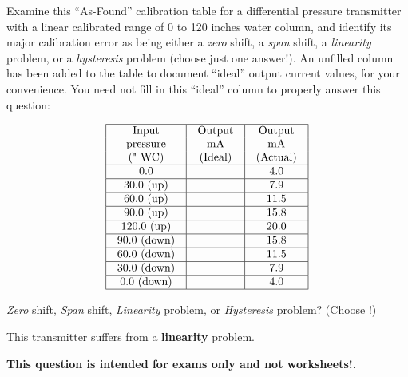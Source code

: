 

Examine this ``As-Found'' calibration table for a differential pressure transmitter with a linear calibrated range of 0 to 120 inches water column, and identify its major calibration error as being either a {\it zero} shift, a {\it span} shift, a {\it linearity} problem, or a {\it hysteresis} problem (choose just one answer!).  An unfilled column has been added to the table to document ``ideal'' output current values, for your convenience.  You need not fill in this ``ideal'' column to properly answer this question:


$$\vbox{\offinterlineskip
\halign{\strut
\vrule \quad\hfil # \ \hfil & 
\vrule \quad\hfil # \ \hfil & 
\vrule \quad\hfil # \ \hfil \vrule \cr
\noalign{\hrule}
%
Input & Output & Output \cr
%
pressure & mA & mA \cr
%
(" WC) & (Ideal) & (Actual) \cr
%
\noalign{\hrule}
%
0.0 & & 4.0 \cr
%
\noalign{\hrule}
%
30.0 (up) & & 7.9 \cr
%
\noalign{\hrule}
%
60.0 (up) & & 11.5 \cr
%
\noalign{\hrule}
%
90.0 (up) & & 15.8 \cr
%
\noalign{\hrule}
%
120.0 (up) & & 20.0 \cr
%
\noalign{\hrule}
%
90.0 (down) & & 15.8 \cr
%
\noalign{\hrule}
%
60.0 (down) & & 11.5 \cr
%
\noalign{\hrule}
%
30.0 (down) & & 7.9 \cr
%
\noalign{\hrule}
%
0.0 (down) & & 4.0 \cr
%
\noalign{\hrule}
} %
}$$ %

{\it Zero} shift, {\it Span} shift, {\it Linearity} problem, or {\it Hysteresis} problem?  (Choose !)







This transmitter suffers from a {\bf linearity} problem.







{\bf This question is intended for exams only and not worksheets!}.


